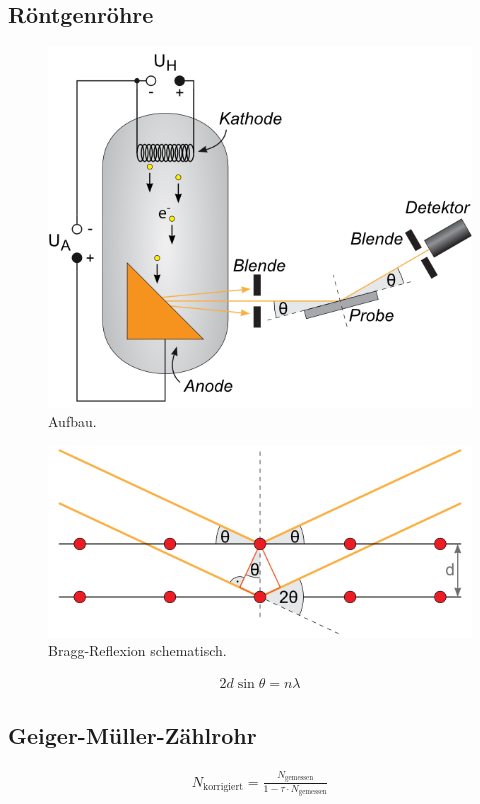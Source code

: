 \documentclass[12pt,a4paper,titlepage,headinclude,bibtotoc]{scrartcl}
\begin{document}
\subsection{Röntgenröhre}
\begin{figure}[!h]
	\centering
	\includegraphics[scale=0.7]{Aufbau.png}
	\caption{Aufbau. \cite[Datum: 02.01.15]{LP23}}
\end{figure}
\begin{figure}[!h]
	\centering
	\includegraphics[scale=0.7]{Bragg.png}
	\caption{Bragg-Reflexion schematisch. \cite[Datum: 02.01.15]{LP23}}
\end{figure}
\begin{align}
	2d\sin\theta=n\lambda
\end{align}

\subsection{Geiger-Müller-Zählrohr}
\begin{align}
	N_\text{korrigiert}=\frac{N_\text{gemessen}}{1-\tau\cdot N_\text{gemessen}}
\end{align}
\end{document}
